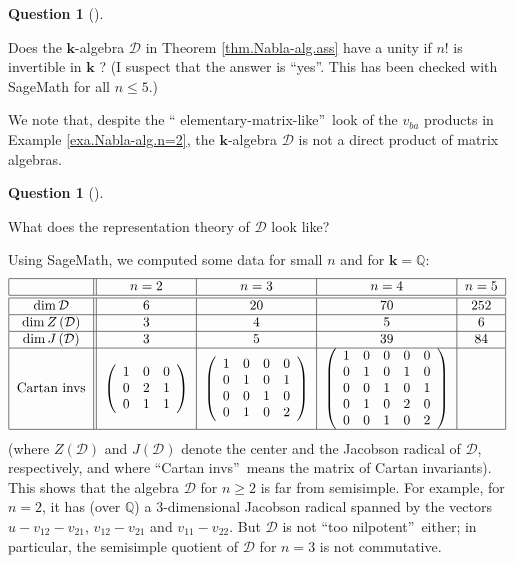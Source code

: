 \documentclass[numbers=enddot,12pt,final,onecolumn,notitlepage]{scrartcl}%
\numberwithin{exer}{subsection}
\theoremstyle{definition}
\newtheorem{quest}[theo]{Question}
\newenvironment{question}[1][]
{\begin{quest}[#1]\begin{leftbar}}
{\end{leftbar}\end{quest}}
\newenvironment{question}[1][Question]{\noindent\textbf{#1.} }{\ \rule{0.5em}{0.5em}}
\newenvironment{noncompile}{}{}
\begin{document}
\begin{question}
Does the $\mathbf{k}$-algebra $\mathcal{D}$ in Theorem \ref{thm.Nabla-alg.ass}
have a unity if $n!$ is invertible in $\mathbf{k}$ ? (I suspect that the
answer is \textquotedblleft yes\textquotedblright. This has been checked with
SageMath for all $n\leq5$.)
\end{question}

\begin{noncompile}
We note that, despite the \textquotedblleft
elementary-matrix-like\textquotedblright\ look of the $v_{ba}$ products in
Example \ref{exa.Nabla-alg.n=2}, the $\mathbf{k}$-algebra $\mathcal{D}$ is not
a direct product of matrix algebras.
\end{noncompile}

\begin{question}
What does the representation theory of $\mathcal{D}$ look like?
\end{question}

Using SageMath, we computed some data for small $n$ and for $\mathbf{k}%
=\mathbb{Q}$:%
\[%
\begin{tabular}
[c]{|c||c|c|c|c|}\hline
& $n=2$ & $n=3$ & $n=4$ & $n=5$\\\hline\hline
$\dim\mathcal{D}$ & $6$ & $20$ & $70$ & $252$\\\hline
$\dim Z\left(  \mathcal{D}\right)  $ & $3$ & $4$ & $5$ & $6$\\\hline
$\dim J\left(  \mathcal{D}\right)  $ & $3$ & $5$ & $39$ & $84$\\\hline
Cartan invs & $\left(
\begin{array}
[c]{ccc}%
1 & 0 & 0\\
0 & 2 & 1\\
0 & 1 & 1
\end{array}
\right)  $ & $\left(
\begin{array}
[c]{cccc}%
1 & 0 & 0 & 0\\
0 & 1 & 0 & 1\\
0 & 0 & 1 & 0\\
0 & 1 & 0 & 2
\end{array}
\right)  $ & $\left(
\begin{array}
[c]{rrrrr}%
1 & 0 & 0 & 0 & 0\\
0 & 1 & 0 & 1 & 0\\
0 & 0 & 1 & 0 & 1\\
0 & 1 & 0 & 2 & 0\\
0 & 0 & 1 & 0 & 2
\end{array}
\right)  $ & \\\hline
\end{tabular}
\
\]
(where $Z\left(  \mathcal{D}\right)  $ and $J\left(  \mathcal{D}\right)  $
denote the center and the Jacobson radical of $\mathcal{D}$, respectively, and
where \textquotedblleft Cartan invs\textquotedblright\ means the matrix of
Cartan invariants). This shows that the algebra $\mathcal{D}$ for $n\geq2$ is
far from semisimple. For example, for $n=2$, it has (over $\mathbb{Q}$) a
$3$-dimensional Jacobson radical spanned by the vectors $u-v_{12}-v_{21}$,
$v_{12}-v_{21}$ and $v_{11}-v_{22}$. But $\mathcal{D}$ is not
\textquotedblleft too nilpotent\textquotedblright\ either; in particular, the
semisimple quotient of $\mathcal{D}$ for $n=3$ is not commutative.
\end{document}
